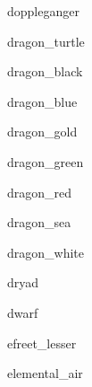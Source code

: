 \documentclass[letterpaper,serif]{module}
\begin{document}
\begin{newmonster}{doppleganger}\end{newmonster}

\begin{newmonster}{dragon_turtle}\end{newmonster}

\begin{newmonster}{dragon_black}\end{newmonster}

\begin{newmonster}{dragon_blue}\end{newmonster}

\begin{newmonster}{dragon_gold}\end{newmonster}

\begin{newmonster}{dragon_green}\end{newmonster}

\begin{newmonster}{dragon_red}\end{newmonster}

\begin{newmonster}{dragon_sea}\end{newmonster}

\begin{newmonster}{dragon_white}\end{newmonster}

\begin{newmonster}{dryad}\end{newmonster}

\begin{newmonster}{dwarf}\end{newmonster}

\begin{newmonster}{efreet_lesser}\end{newmonster}

\begin{newmonster}{elemental_air}\end{newmonster}
\end{document}
